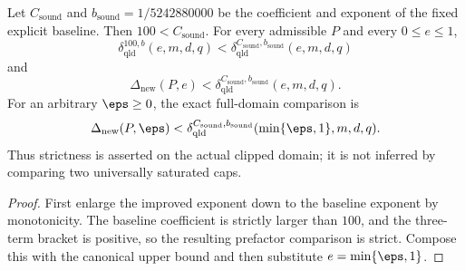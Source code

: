 \begin{theorem}
\label{thm:pauli-final-baseline-comparison}
\leanok
{}
Let $C_{\mathrm{sound}}$ and $b_{\mathrm{sound}}=1/5242880000$ be the
coefficient and exponent of the fixed explicit baseline.  Then
$100<C_{\mathrm{sound}}$.  For every admissible $P$ and every
$0\leq e\leq1$,
\[
 \delta_{\mathrm{qld}}^{100,b}(e,m,d,q)
 <\delta_{\mathrm{qld}}^{C_{\mathrm{sound}},b_{\mathrm{sound}}}
    (e,m,d,q)
\]
and
\[
 \Delta_{\mathrm{new}}(P,e)
 <\delta_{\mathrm{qld}}^{C_{\mathrm{sound}},b_{\mathrm{sound}}}
    (e,m,d,q).
\]
For an arbitrary $\eps\geq0$, the exact full-domain comparison is
\[
 \Delta_{\mathrm{new}}(P,\eps)
 <\delta_{\mathrm{qld}}^{C_{\mathrm{sound}},b_{\mathrm{sound}}}
    (\min\{\eps,1\},m,d,q).
\]
Thus strictness is asserted on the actual clipped domain; it is not inferred
by comparing two universally saturated caps.
\end{theorem}
\begin{proof}
\leanok
{}
First enlarge the improved exponent down to the baseline exponent by
monotonicity.  The baseline coefficient is strictly larger than $100$, and
the three-term bracket is positive, so the resulting prefactor comparison is
strict.  Compose this with the canonical upper bound and then substitute
$e=\min\{\eps,1\}$.
\end{proof}

